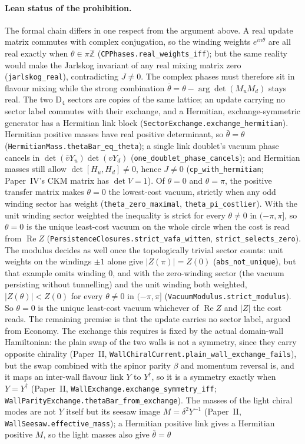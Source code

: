 \paragraph{Lean status of the prohibition.} The formal chain differs in one respect from the argument above. A real update matrix commutes with complex conjugation, so the winding weights $e^{in\theta}$ are all real exactly when $\theta\in\pi\mathbb Z$ (\texttt{CPPhases.real\_weights\_iff}); but the same reality would make the Jarlskog invariant of any real mixing matrix zero (\texttt{jarlskog\_real}), contradicting $J\neq0$. The complex phases must therefore sit in flavour mixing while the strong combination $\bar\theta=\theta-\arg\det(M_uM_d)$ stays real. The two D$_4$ sectors are copies of the same lattice; an update carrying no sector label commutes with their exchange, and a Hermitian, exchange-symmetric generator has a Hermitian link block (\texttt{SectorExchange.exchange\_hermitian}). Hermitian positive masses have real positive determinant, so $\bar\theta=\theta$ (\texttt{HermitianMass.thetaBar\_eq\_theta}); a single link doublet's vacuum phase cancels in $\det(\bar vY_u)\det(vY_d)$ (\texttt{one\_doublet\_phase\_cancels}); and Hermitian masses still allow $\det[H_u,H_d]\neq0$, hence $J\neq0$ (\texttt{cp\_with\_hermitian}; Paper~IV's CKM matrix has $\det V=1$). Of $\theta=0$ and $\theta=\pi$, the positive transfer matrix makes $\theta=0$ the lowest-cost vacuum, strictly when any odd winding sector has weight (\texttt{theta\_zero\_maximal}, \texttt{theta\_pi\_costlier}). With the unit winding sector weighted the inequality is strict for every $\theta\neq0$ in $(-\pi,\pi]$, so $\theta=0$ is the unique least-cost vacuum on the whole circle when the cost is read from $\operatorname{Re}Z$ (\texttt{PersistenceClosures.strict\_vafa\_witten}, \texttt{strict\_selects\_zero}). The modulus decides as well once the topologically trivial sector counts: unit weights on the windings $\pm1$ alone give $|Z(\pi)|=Z(0)$ (\texttt{abs\_not\_unique}), but that example omits winding $0$, and with the zero-winding sector (the vacuum persisting without tunnelling) and the unit winding both weighted, $|Z(\theta)|<Z(0)$ for every $\theta\neq0$ in $(-\pi,\pi]$ (\texttt{VacuumModulus.strict\_modulus}). So $\theta=0$ is the unique least-cost vacuum whichever of $\operatorname{Re}Z$ and $|Z|$ the cost reads. The remaining premise is that the update carries no sector label, argued from Economy. The exchange this requires is fixed by the actual domain-wall Hamiltonian: the plain swap of the two walls is not a symmetry, since they carry opposite chirality (Paper~II, \texttt{WallChiralCurrent.plain\_wall\_exchange\_fails}), but the swap combined with the spinor parity $\beta$ and momentum reversal is, and it maps an inter-wall flavour link $Y$ to $Y^\dagger$, so it is a symmetry exactly when $Y=Y^\dagger$ (Paper~II, \texttt{WallExchange.exchange\_symmetry\_iff}; \texttt{WallParityExchange.thetaBar\_from\_exchange}). The masses of the light chiral modes are not $Y$ itself but its seesaw image $M=\delta^2Y^{-1}$ (Paper~II, \texttt{WallSeesaw.effective\_mass}); a Hermitian positive link gives a Hermitian positive $M$, so the light masses also give $\bar\theta=\theta$ 
